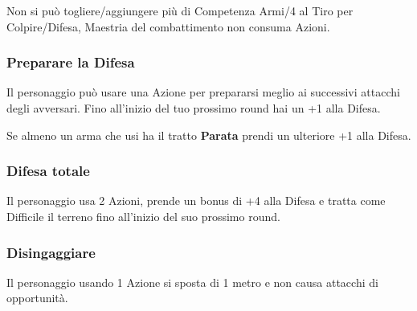 \begin{multicols}{2}
Non si può togliere/aggiungere più di Competenza Armi/4 al Tiro per Colpire/Difesa, Maestria del combattimento non consuma Azioni.

\subsubsection{Preparare la Difesa}\label{preparareladifesa}\hypertarget{preparareladifesa}{}

Il personaggio può usare una Azione per prepararsi meglio ai successivi attacchi degli avversari. Fino all'inizio del tuo prossimo round hai un +1 alla Difesa.

Se almeno un arma che usi ha il tratto \textbf{Parata} prendi un ulteriore +1 alla Difesa.

\subsubsection{Difesa totale} \label{difesatotale}\hypertarget{difesatotale}{}

Il personaggio usa 2 Azioni, prende un bonus di +4 alla Difesa e tratta come Difficile il terreno fino all'inizio del suo prossimo round.

\subsubsection{Disingaggiare} \label{disingaggiare}\hypertarget{disingaggiare}{}

Il personaggio usando 1 Azione si sposta di 1 metro e non causa attacchi di opportunità.




\end{multicols}
